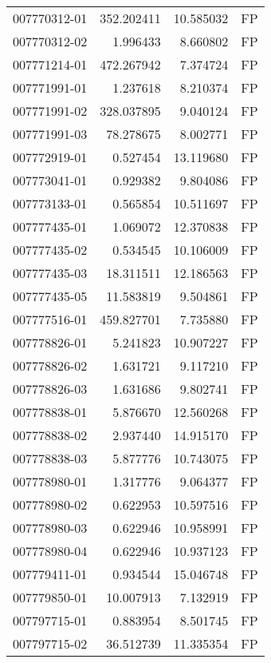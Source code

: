 \begin{tabular}{lrrl}
007770312-01 &  352.202411 &      10.585032 &   FP \\
007770312-02 &    1.996433 &       8.660802 &   FP \\
007771214-01 &  472.267942 &       7.374724 &   FP \\
007771991-01 &    1.237618 &       8.210374 &   FP \\
007771991-02 &  328.037895 &       9.040124 &   FP \\
007771991-03 &   78.278675 &       8.002771 &   FP \\
007772919-01 &    0.527454 &      13.119680 &   FP \\
007773041-01 &    0.929382 &       9.804086 &   FP \\
007773133-01 &    0.565854 &      10.511697 &   FP \\
007777435-01 &    1.069072 &      12.370838 &   FP \\
007777435-02 &    0.534545 &      10.106009 &   FP \\
007777435-03 &   18.311511 &      12.186563 &   FP \\
007777435-05 &   11.583819 &       9.504861 &   FP \\
007777516-01 &  459.827701 &       7.735880 &   FP \\
007778826-01 &    5.241823 &      10.907227 &   FP \\
007778826-02 &    1.631721 &       9.117210 &   FP \\
007778826-03 &    1.631686 &       9.802741 &   FP \\
007778838-01 &    5.876670 &      12.560268 &   FP \\
007778838-02 &    2.937440 &      14.915170 &   FP \\
007778838-03 &    5.877776 &      10.743075 &   FP \\
007778980-01 &    1.317776 &       9.064377 &   FP \\
007778980-02 &    0.622953 &      10.597516 &   FP \\
007778980-03 &    0.622946 &      10.958991 &   FP \\
007778980-04 &    0.622946 &      10.937123 &   FP \\
007779411-01 &    0.934544 &      15.046748 &   FP \\
007779850-01 &   10.007913 &       7.132919 &   FP \\
007797715-01 &    0.883954 &       8.501745 &   FP \\
007797715-02 &   36.512739 &      11.335354 &   FP \\

\end{tabular}
